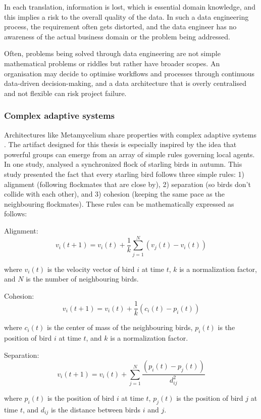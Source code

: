 \documentclass[preprint,12pt]{elsarticle}
\begin{document}
In each translation, information is lost, which is essential domain knowledge, and this implies a risk to the overall quality of the data. In such a data engineering process, the requirement often gets distorted, and the data engineer has no awareness of the actual business domain or the problem being addressed.

Often, problems being solved through data engineering are not simple mathematical problems or riddles but rather have broader scopes. An organisation may decide to optimise workflows and processes through continuous data-driven decision-making, and a data architecture that is overly centralised and not flexible can risk project failure.


\subsubsection{Complex adaptive systems}

Architectures like Metamycelium share properties with complex adaptive systems \cite{holland1992complex}. The artifact designed for this thesis is especially inspired by the idea that powerful groups can emerge from an array of simple rules governing local agents. In one study, \citeauthor{reynolds1987flocks} analysed a synchronized flock of starling birds in autumn. This study presented the fact that every starling bird follows three simple rules: 1) alignment (following flockmates that are close by), 2) separation (so birds don't collide with each other), and 3) cohesion (keeping the same pace as the neighbouring flockmates). These rules can be mathematically expressed as follows:

Alignment:
$$
v_i(t+1) = v_i(t) + \frac{1}{k} \sum_{j=1}^{N} (v_j(t) - v_i(t))
$$

where $v_i(t)$ is the velocity vector of bird $i$ at time $t$, $k$ is a normalization factor, and $N$ is the number of neighbouring birds.

Cohesion:
$$
v_i(t+1) = v_i(t) + \frac{1}{k} (c_i(t) - p_i(t))
$$

where $c_i(t)$ is the center of mass of the neighbouring birds, $p_i(t)$ is the position of bird $i$ at time $t$, and $k$ is a normalization factor.

Separation:
$$
v_i(t+1) = v_i(t) + \sum_{j=1}^{N} \frac{(p_i(t) - p_j(t))}{d_{ij}^2}
$$

where $p_i(t)$ is the position of bird $i$ at time $t$, $p_j(t)$ is the position of bird $j$ at time $t$, and $d_{ij}$ is the distance between birds $i$ and $j$.
\end{document}
